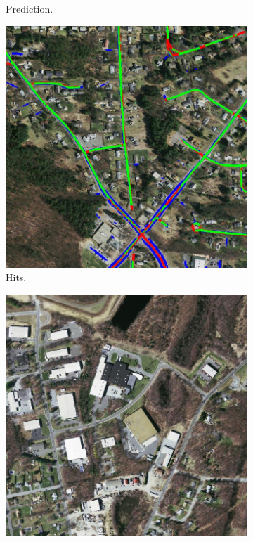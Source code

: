 \begin{figure}[H]
\begin{subfigure}{0.23\textwidth}
\caption{ Prediction. }
\vspace{0.2cm} %
\end{subfigure}
\hspace*{\fill} %
\begin{subfigure}{0.23\textwidth}
\includegraphics[width=\textwidth]{figs/appendix/hit11128870_15.jpg}
\caption{ Hits. }
\vspace{0.2cm} %
\end{subfigure}
\begin{subfigure}{0.23\textwidth}
\includegraphics[width=\textwidth]{figs/appendix/img11728825_15.jpg}

\end{subfigure}
\end{figure}
